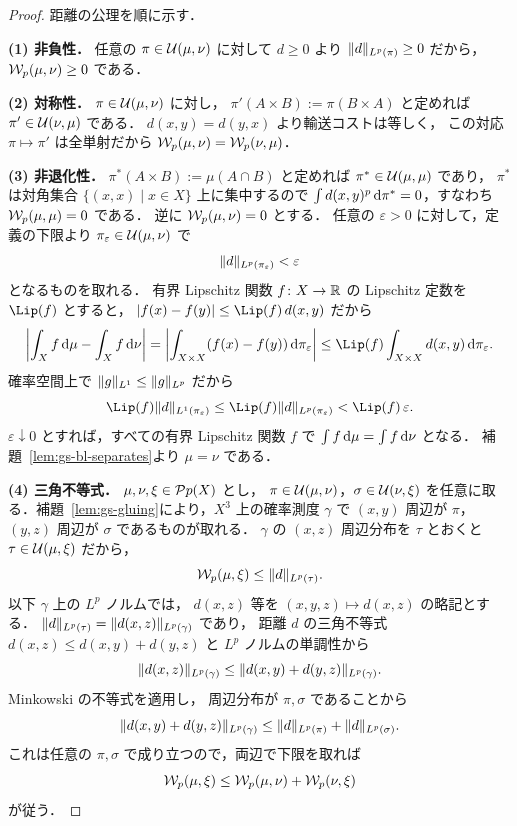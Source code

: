 \begin{proof}
  距離の公理を順に示す．

  \textbf{(1) 非負性．}
  任意の $\pi\in\mathcal{U}(\mu,\nu)$ に対して
  $d\geq 0$ より $\lVert d \rVert_{L^p(\pi)}\geq 0$ だから，
  $\mathcal{W}_p(\mu,\nu)\geq 0$ である．

  \textbf{(2) 対称性．}
  $\pi\in\mathcal{U}(\mu,\nu)$ に対し，
  $\pi'(A\times B):=\pi(B\times A)$ と定めれば
  $\pi'\in\mathcal{U}(\nu,\mu)$ である．
  $d(x,y)=d(y,x)$ より輸送コストは等しく，
  この対応 $\pi\mapsto\pi'$ は全単射だから
  $\mathcal{W}_p(\mu,\nu)=\mathcal{W}_p(\nu,\mu)$．

  \textbf{(3) 非退化性．}
  $\pi^*(A\times B):=\mu(A\cap B)$ と定めれば
  $\pi^*\in\mathcal{U}(\mu,\mu)$ であり，
  $\pi^*$ は対角集合 $\{(x,x)\mid x\in X\}$ 上に集中するので
  $\int d(x,y)^p\,\mathrm{d}\pi^*=0$，すなわち $\mathcal{W}_p(\mu,\mu)=0$ である．
  逆に $\mathcal{W}_p(\mu,\nu)=0$ とする．
  任意の $\varepsilon>0$ に対して，定義の下限より
  $\pi_\varepsilon\in\mathcal{U}(\mu,\nu)$ で
  \[
    \lVert d \rVert_{L^p(\pi_\varepsilon)}<\varepsilon
  \]
  となるものを取れる．
  有界 Lipschitz 関数 $f\colon X\to\mathbb{R}$ の
  Lipschitz 定数を $\Lip(f)$ とすると，
  $\abs{f(x)-f(y)}\leq\Lip(f)\,d(x,y)$ だから
  \[
    \left|\int_X f\,\d\mu-\int_X f\,\d\nu\right|
    =
    \left|\int_{X\times X}(f(x)-f(y))\,\d\pi_\varepsilon\right|
    \leq
    \Lip(f)\int_{X\times X}d(x,y)\,\d\pi_\varepsilon.
  \]
  確率空間上で
  $\lVert g \rVert_{L^1}\leq\lVert g \rVert_{L^p}$ だから
  \[
    \Lip(f)\norm{d}_{L^1(\pi_\varepsilon)}
    \leq
    \Lip(f)\norm{d}_{L^p(\pi_\varepsilon)}
    <
    \Lip(f)\,\varepsilon.
  \]
  $\varepsilon\downarrow0$ とすれば，すべての有界 Lipschitz 関数 $f$ で
  $\int f\,\mathrm{d}\mu=\int f\,\mathrm{d}\nu$ となる．
  補題~\ref{lem:gs-bl-separates}より $\mu=\nu$ である．

  \textbf{(4) 三角不等式．}
  $\mu,\nu,\xi\in\mathcal{P}{p}(X)$ とし，
  $\pi\in\mathcal{U}(\mu,\nu)$，$\sigma\in\mathcal{U}(\nu,\xi)$
  を任意に取る．補題~\ref{lem:gs-gluing}により，$X^3$ 上の確率測度
  $\gamma$ で $(x,y)$ 周辺が $\pi$，$(y,z)$ 周辺が $\sigma$ であるものが取れる．
  $\gamma$ の $(x,z)$ 周辺分布を $\tau$ とおくと
  $\tau\in\mathcal{U}(\mu,\xi)$ だから，
  \[
    \mathcal{W}_p(\mu,\xi)
    \leq \lVert d \rVert_{L^p(\tau)}.
  \]
  以下 $\gamma$ 上の $L^p$ ノルムでは，
  $d(x,z)$ 等を $(x,y,z)\mapsto d(x,z)$ の略記とする．
  $\lVert d \rVert_{L^p(\tau)}=\lVert d(x,z) \rVert_{L^p(\gamma)}$ であり，
  距離 $d$ の三角不等式 $d(x,z)\leq d(x,y)+d(y,z)$ と
  $L^p$ ノルムの単調性から
  \[
    \lVert d(x,z) \rVert_{L^p(\gamma)}
    \leq \lVert d(x,y)+d(y,z) \rVert_{L^p(\gamma)}.
  \]
  Minkowski の不等式を適用し，
  周辺分布が $\pi,\sigma$ であることから
  \[
    \lVert d(x,y)+d(y,z) \rVert_{L^p(\gamma)}
    \leq \lVert d \rVert_{L^p(\pi)}
    + \lVert d \rVert_{L^p(\sigma)}.
  \]
  これは任意の $\pi,\sigma$ で成り立つので，両辺で下限を取れば
  \[
    \mathcal{W}_p(\mu,\xi)
    \leq
    \mathcal{W}_p(\mu,\nu)+\mathcal{W}_p(\nu,\xi)
  \]
  が従う．
\end{proof}
